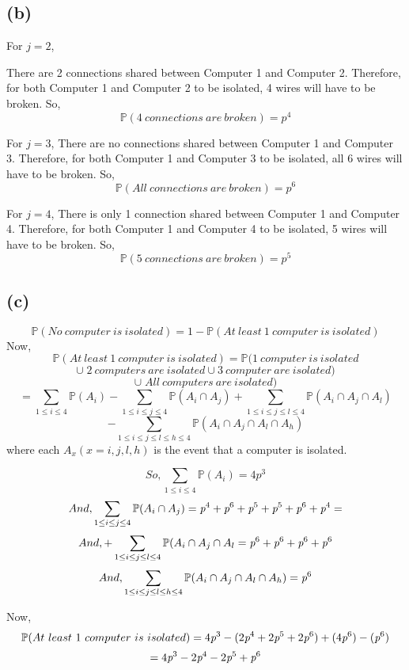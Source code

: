 \documentclass{article}
\begin{document}
		\subsection*{(b)}
			For $j=2$,
			
			There are 2 connections shared between Computer 1 and Computer 2. Therefore, for both Computer 1 and Computer 2 to be isolated, 4 wires will have to be broken. So,
			$$ \mathbb{P}(4\ connections\ are\ broken) = \textit{p}^4 $$
			
			For $j=3$,
			There are no connections shared between Computer 1 and Computer 3. Therefore, for both Computer 1 and Computer 3 to be isolated, all 6 wires will have to be broken. So,
			$$ \mathbb{P}(All\ connections\ are\ broken) = \textit{p}^6 $$
			
			For $j=4$,
			There is only 1 connection shared between Computer 1 and Computer 4. Therefore, for both Computer 1 and Computer 4 to be isolated, 5 wires will have to be broken. So,
			$$ \mathbb{P}(5\ connections\ are\ broken) = \textit{p}^5 $$

		\subsection*{(c)}
			$$ \mathbb{P}(No\ computer\ is\ isolated) = 1 - \mathbb{P}(At\ least\ 1\ computer\ is\ isolated) $$
			Now,
			$$ \mathbb{P}(At\ least\ 1\ computer\ is\ isolated) = \mathbb{P}(1\ computer\ is\ isolated$$
			$$ \cup \; 2\ computers\ are\ isolated \cup 3\ computer\ are\ isolated)$$
			$$ \cup \; All\ computers\ are\ isolated) $$
			$$ = \sum_{1 \leq i \leq 4} \mathbb{P}(A_i) - \sum_{1 \leq i \leq j \leq 4} \mathbb{P}(A_i \cap A_j)+\sum_{1 \leq i \leq j \leq l \leq 4} \mathbb{P}(A_i \cap A_j \cap A_l)$$
			$$ -\sum_{1 \leq i \leq j \leq l \leq h \leq 4} \mathbb{P}(A_i \cap A_j \cap A_l \cap A_h)$$
			where each $A_x (x=i,j,l,h)$ is the event that a computer is isolated.

			$$ So, \sum_{1 \leq i \leq 4} \mathbb{P}(A_i) = 4\textit{p}^3 $$
			$$ And, \sum_{1 \leq i \leq j \leq 4} \mathbb{P}(A_i \cap A_j) = \emph{p}^4+\emph{p}^6+\emph{p}^5+\emph{p}^5+\emph{p}^6+\emph{p}^4= $$
			$$ And, +\sum_{1 \leq i \leq j \leq l \leq 4} \mathbb{P}(A_i \cap A_j \cap A_l = \emph{p}^6+\emph{p}^6+\emph{p}^6+\emph{p}^6 $$
			$$ And, \sum_{1 \leq i \leq j \leq l \leq h \leq 4} \mathbb{P}(A_i \cap A_j \cap A_l \cap A_h) = \emph{p}^6 $$			
			
			Now,
			$$ \mathbb{P}(At\ least\ 1\ computer\ is\ isolated) = 4\emph{p}^3-(2\emph{p}^4+2\emph{p}^5+2\emph{p}^6)+(4\emph{p}^6)-(\emph{p}^6) $$
			$$ = 4\emph{p}^3-2\emph{p}^4-2\emph{p}^5+\emph{p}^6 $$
			
\end{document}
